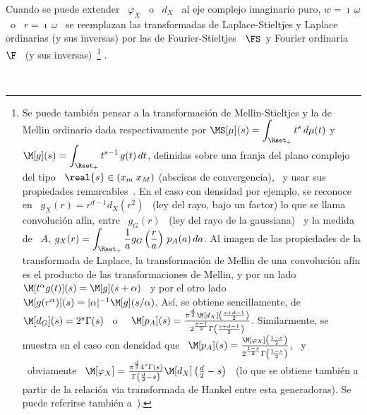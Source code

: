 Cuando se puede extender \ $\varphi_X$ \  o \ $d_X$ \ al eje complejo imaginario
puro, $w =  \imath \, \omega$ \ o \  $r = \imath \, \omega$  \ se reemplazan las
transformadas de Laplace-Stieltjes y Laplace ordinarias (y sus inversas) por las
de  Fourier-Stieltjes   \  $\FS$\   y  Fourier  ordinaria   \  $\F$  \   (y  sus
inversas)~\footnote{Se   puede  tambi\'en  pensar   a  la   transformaci\'on  de
  Mellin-Stieltjes   y  la   de  Mellin   ordinario  dada   respectivamente  por
  $\displaystyle  \MS[\mu](s) =  \int_{\Rset_+} t^s  \, d\mu(t)$  \quad  y \quad
  $\displaystyle  \M[g](s) = \int_{\Rset_+}  t^{s-1} \,  g(t) \,  dt$, definidas
  sobre una  franja del plano  complejo del tipo  \ $\real{s} \in (x_m  \; x_M)$
  (abscisas de convergencia), \  y usar sus propiedades remarcables~\cite{Zol57,
    Pou99, Pou10,  Wid46, ParKam01}.   En el caso  con densidad por  ejemplo, se
  reconoce en \  $g_X(r) = r^{d-1} d_X\left( r^2 \right)$ \  (ley del rayo, bajo
  un factor) lo  que se llama convoluci\'on af\'in, entre \  $g_G(r)$ \ (ley del
  rayo  de la  gaussiana)  \  y la  medida  de \  $A$,  $\displaystyle g_X(r)  =
  \int_{\Rset_+} \frac{1}{a} g_G\left( \frac{r}{a} \right) \, p_A(a) \, da$.  Al
  imagen de las  propiedades de la transformada de  Laplace, la transformaci\'on
  de Mellin de  una convoluci\'on af\'in es el  producto de las transformaciones
  de Mellin, y por un lado \ $\M[t^\alpha g(t)](s) = \M[g](s+\alpha)$ \ y por el
  otro lado  \ $\M[g(r^\alpha)](s) = |\alpha|^{-1}  \M[g](s/\alpha)$.  As\'i, se
  obtiene  sencillamente,  de  \  $\M[d_G](s)  =  2^s  \Gamma(s)$~\cite[Cap.~12,
  Tabla~12.1]{Pou10}   o~\cite[Cap.~18,  Tabla~18.1]{Pou99}   \   $\M[p_A](s)  =
  \frac{\pi^{\frac{d}{2}}              \M[d_X]\left(             \frac{s+d-1}{2}
    \right)}{2^{\frac{s-1}{2}} \Gamma\left( \frac{s+d-1}{2} \right)}$.
  Similarmente,  se  muestra  en  el  caso  con densidad  que  \  $\M[p_A](s)  =
  \frac{\M[\varphi_X]\left(       \frac{1-s}{2}       \right)}{2^{\frac{1-s}{2}}
    \Gamma\left( \frac{1-s}{2} \right)}$,
  \   y   \   obviamente   \  $\M[\varphi_X]   =   \frac{\pi^{\frac{d}{2}}   4^s
    \Gamma(s)}{\Gamma\left( \frac{d}{2} - s \right)} \M[d_X]\left( \frac{d}{2} -
    s \right)$  \ (lo  que se obtiene  tambi\'en a  partir de la  relaci\'on via
  transformada de  Hankel entre esta generadoras). Se  puede referirse tambi\'en
  a~\cite[\S~3.2.1]{Zoz12}).  }
%
\cite{Zol57, Pou99, Pou10, Wid46, ParKam01}.

\

